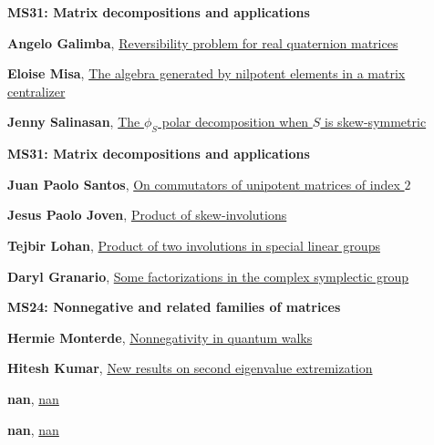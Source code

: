 \documentclass[ILAS2025-program.tex]{subfiles}
\begin{document}
        \begin{description}
    \item[] {\color{mstitle}\textbf{MS31: Matrix decompositions and applications}} 
    \item[] \hypertarget{up0274}{}\textbf{Angelo Galimba}, \hyperlink{down0274}{Reversibility problem for real quaternion matrices}
        \item[] \hypertarget{up0275}{}\textbf{Eloise Misa}, \hyperlink{down0275}{The algebra generated by nilpotent elements in a matrix centralizer}
        \item[] \hypertarget{up0276}{}\textbf{Jenny Salinasan}, \hyperlink{down0276}{The $\phi_S$ polar decomposition when $S$ is skew-symmetric}
        \end{description}
    \begin{description}
    \item[] {\color{mstitle}\textbf{MS31: Matrix decompositions and applications}} 
    \item[] \hypertarget{up0307}{}\textbf{Juan Paolo Santos}, \hyperlink{down0307}{On commutators of unipotent matrices of index $2$}
        \item[] \hypertarget{up0308}{}\textbf{Jesus Paolo Joven}, \hyperlink{down0308}{Product of skew-involutions}
        \item[] \hypertarget{up0309}{}\textbf{Tejbir Lohan}, \hyperlink{down0309}{Product of two involutions in special linear groups}
        \item[] \hypertarget{up0310}{}\textbf{Daryl Granario}, \hyperlink{down0310}{Some factorizations in the complex symplectic group}
        \end{description}
    \begin{description}
    \item[] {\color{mstitle}\textbf{MS24: Nonnegative and related families of matrices}} 
    \item[] \hypertarget{up0351}{}\textbf{Hermie Monterde}, \hyperlink{down0351}{Nonnegativity in quantum walks
}
        \item[] \hypertarget{up0352}{}\textbf{Hitesh Kumar}, \hyperlink{down0352}{New results on second eigenvalue extremization}
        \item[] \hypertarget{up0353}{}\textbf{nan}, \hyperlink{down0353}{nan}
        \item[] \hypertarget{up0354}{}\textbf{nan}, \hyperlink{down0354}{nan}
        \end{description}
    \newpage
\end{document}
